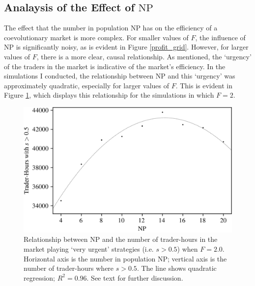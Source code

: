 \documentclass[conference]{IEEEtran}
\begin{document}
\subsection{Analaysis of the Effect of $\mathrm{NP}$}

The effect that the number in population $\mathrm{NP}$ has on the efficiency of a coevolutionary market is more complex. 
For smaller values of $F$, the influence of $\mathrm{NP}$ is significantly noisy, as is evident in Figure \ref{profit_grid}.
However, for larger values of $F$, there is a more clear, causal relationship.
As mentioned, the `urgency' of the traders in the market is indicative of the market's efficiency.
In the simulations I conducted, the relationship between $\mathrm{NP}$ and this `urgency' was approximately quadratic, especially for larger values of $F$.
This is evident in Figure \ref{F=2.0_strats}, which displays this relationship for the simulations in which $F=2$.

\begin{figure}[htbp]
    \centerline{\includegraphics[width=\columnwidth]{f=2.0_strats.png}}
    \caption{
        Relationship between $\mathrm{NP}$ and the number of trader-hours in the market playing `very urgent' strategies (i.e. $s>0.5$) when $F=2.0$.
        Horizontal axis is the number in population $\mathrm{NP}$; vertical axis is the number of trader-hours where $s>0.5$.
        The line shows quadratic regression; $R^2=0.96$.
        See text for further discussion.
    }
    \label{F=2.0_strats}
\end{figure}
\end{document}
